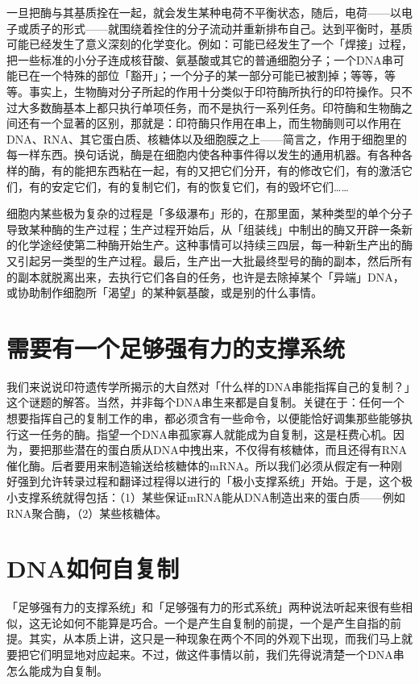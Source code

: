 \documentclass[
  12pt,
  twoside,
  openright,
  oldfontcommands,
]{memoir}
\begin{document}
一旦把酶与其基质拴在一起，就会发生某种电荷不平衡状态，随后，电荷------以电子或质子的形式------就围绕着拴住的分子流动并重新排布自己。达到平衡时，基质可能已经发生了意义深刻的化学变化。例如：可能已经发生了一个「焊接」过程，把一些标准的小分子连成核苷酸、氨基酸或其它的普通细胞分子；一个DNA串可能已在一个特殊的部位「豁开」；一个分子的某一部分可能已被割掉；等等，等等。事实上，生物酶对分子所起的作用十分类似于印符酶所执行的印符操作。只不过大多数酶基本上都只执行单项任务，而不是执行一系列任务。印符酶和生物酶之间还有一个显著的区别，那就是：印符酶只作用在串上，而生物酶则可以作用在DNA、RNA、其它蛋白质、核糖体以及细胞膜之上------简言之，作用于细胞里的每一样东西。换句话说，酶是在细胞内使各种事件得以发生的通用机器。有各种各样的酶，有的能把东西粘在一起，有的又把它们分开，有的修改它们，有的激活它们，有的安定它们，有的复制它们，有的恢复它们，有的毁坏它们\ldots\ldots{}

细胞内某些极为复杂的过程是「多级瀑布」形的，在那里面，某种类型的单个分子导致某种酶的生产过程；生产过程开始后，从「组装线」中制出的酶又开辟一条新的化学途经使第二种酶开始生产。这种事情可以持续三四层，每一种新生产出的酶又引起另一类型的生产过程。最后，生产出一大批最终型号的酶的副本，然后所有的副本就脱离出来，去执行它们各自的任务，也许是去除掉某个「异端」DNA，或协助制作细胞所「渴望」的某种氨基酸，或是别的什么事情。

\section{需要有一个足够强有力的支撑系统}

我们来说说印符遗传学所揭示的大自然对「什么样的DNA串能指挥自己的复制？」这个谜题的解答。当然，并非每个DNA串生来都是自复制。关键在于：任何一个想要指挥自己的复制工作的串，都必须含有一些命令，以便能恰好调集那些能够执行这一任务的酶。指望一个DNA串孤家寡人就能成为自复制，这是枉费心机。因为，要把那些潜在的蛋白质从DNA中拽出来，不仅得有核糖体，而且还得有RNA催化酶。后者要用来制造输送给核糖体的mRNA。所以我们必须从假定有一种刚好强到允许转录过程和翻译过程得以进行的「极小支撑系统」开始。于是，这个极小支撑系统就得包括：（1）某些保证mRNA能从DNA制造出来的蛋白质------例如RNA聚合酶，（2）某些核糖体。

\section{DNA如何自复制}

「足够强有力的支撑系统」和「足够强有力的形式系统」两种说法听起来很有些相似，这无论如何不能算是巧合。一个是产生自复制的前提，一个是产生自指的前提。其实，从本质上讲，这只是一种现象在两个不同的外观下出现，而我们马上就要把它们明显地对应起来。不过，做这件事情以前，我们先得说清楚一个DNA串怎么能成为自复制。
\end{document}
